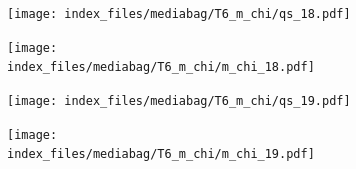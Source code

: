 \documentclass[
  11pt,
  letterpaper,
]{scrreprt}
\begin{document}
\begin{figure}

\begin{minipage}{0.50\linewidth}

\begin{figure}[H]

{\centering \texttt{[image: index\_files/mediabag/T6\_m\_chi/qs\_18.pdf]}

}


\end{figure}%

\end{minipage}%
%
\begin{minipage}{0.50\linewidth}

\begin{figure}[H]

{\centering \texttt{[image: index\_files/mediabag/T6\_m\_chi/m\_chi\_18.pdf]}

}


\end{figure}%

\end{minipage}%

\end{figure}%

\begin{figure}

\begin{minipage}{0.50\linewidth}

\begin{figure}[H]

{\centering \texttt{[image: index\_files/mediabag/T6\_m\_chi/qs\_19.pdf]}

}


\end{figure}%

\end{minipage}%
%
\begin{minipage}{0.50\linewidth}

\begin{figure}[H]

{\centering \texttt{[image: index\_files/mediabag/T6\_m\_chi/m\_chi\_19.pdf]}

}


\end{figure}%

\end{minipage}%

\end{figure}%
\end{document}
